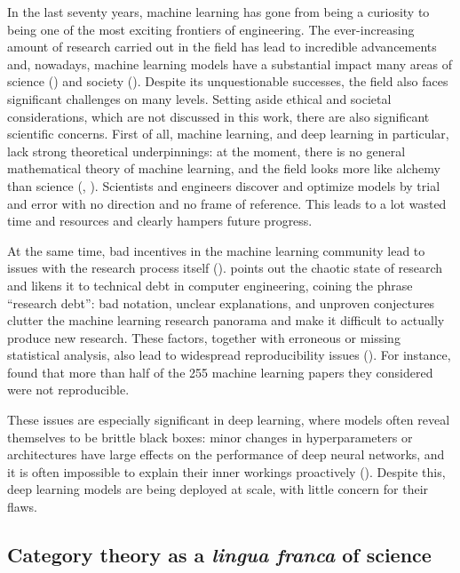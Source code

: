 \documentclass[11pt,a4paper,openright,twoside]{report}
\theoremstyle{plain}
\theoremstyle{definition}
\newcommand\dblquote[1]{\textquotedblleft #1\textquotedblright}
\begin{document}
In the last seventy years, machine learning has gone from being a curiosity to being one of the most exciting frontiers of engineering. The ever-increasing amount of research carried out in the field has lead to incredible advancements and, nowadays, machine learning models have a substantial impact many areas of science (\cite{hajkowicz2023artificial}) and society (\cite{khogali2023blended}). Despite its unquestionable successes, the field also faces significant challenges on many levels. Setting aside ethical and societal considerations, which are not discussed in this work, there are also significant scientific concerns. First of all, machine learning, and deep learning in particular, lack strong theoretical underpinnings: at the moment, there is no general mathematical theory of machine learning, and the field looks more like alchemy than science (\cite{gavranovic2024fundamental}, \cite{rahimi2017machine}). Scientists and engineers discover and optimize models by trial and error with no direction and no frame of reference. This leads to a lot wasted time and resources and clearly hampers future progress.

At the same time, bad incentives in the machine learning community lead to issues with the research process itself (\cite{shiebler2021category}). \cite{olah2017research} points out the chaotic state of research and likens it to technical debt in computer engineering, coining the phrase \dblquote{research debt}: bad notation, unclear explanations, and unproven conjectures clutter the machine learning research panorama and make it difficult to actually produce new research. These factors, together with erroneous or missing statistical analysis, also lead to widespread reproducibility issues (\cite{gundersen2022sources}). For instance, \cite{raff2019step} found that more than half of the 255 machine learning papers they considered were not reproducible. 

These issues are especially significant in deep learning, where models often reveal themselves to be brittle black boxes: minor changes in hyperparameters or architectures have large effects on the performance of deep neural networks, and it is often impossible to explain their inner workings proactively (\cite{gavranovic2024fundamental}).
Despite this, deep learning models are being deployed at scale, with little concern for their flaws.  

\subsection*{Category theory as a \textit{lingua franca} of science}
\end{document}
